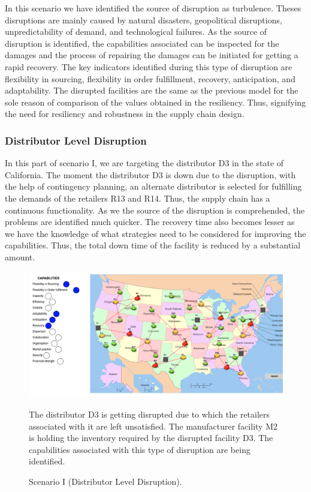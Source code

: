 In this scenario we have identified the source of disruption as turbulence. Theses disruptions are mainly caused by natural disasters, geopolitical disruptions, unpredictability of demand, and technological failures. As the source of disruption is identified, the capabilities associated can be inspected for the damages and the process of repairing the damages can be initiated for getting a rapid recovery. The key indicators identified during this type of disruption are flexibility in sourcing, flexibility in order fulfillment, recovery, anticipation, and adaptability. The disrupted facilities are the same as the previous model for the sole reason of comparison of the values obtained in the resiliency. Thus, signifying the need for resiliency and robustness in the supply chain design.

\subsubsection{Distributor Level Disruption}
In this part of scenario I, we are targeting the distributor D3 in the state of California. The moment the distributor D3 is down due to the disruption, with the help of contingency planning, an alternate distributor is selected for fulfilling the demands of the retailers R13 and R14. Thus, the supply chain has a continuous functionality. As we the source of the disruption is comprehended, the problems are identified much quicker. The recovery time also becomes lesser as we have the knowledge of what strategies need to be considered for improving the capabilities. Thus, the total down time of the facility is reduced by a substantial amount.

\begin{figure}[H]
  \centering
  \includegraphics[width=6.5in]{figures/pdf/Scenario1DLD.png}\\
  \caption{Scenario I (Distributor Level Disruption).}
  {The distributor D3 is getting disrupted due to which the retailers associated with it are left unsatisfied. The manufacturer facility M2 is holding the inventory required by the disrupted facility D3. The capabilities associated with this type of disruption are being identified.}
  \label{SID}
\end{figure}

